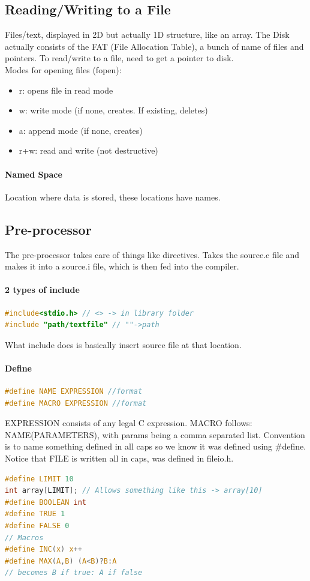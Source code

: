 \documentclass[12 pt]{article}
\begin{document}
\subsection{Reading/Writing to a File}
Files/text, displayed in 2D but actually 1D structure, like an array. The Disk actually consists of the FAT (File Allocation Table), a bunch of name of files and pointers. To read/write to a file, need to get a pointer to disk.
\\ Modes for opening files (fopen):
\begin{itemize}
\item r: opens file in read mode
\item w: write mode (if none, creates. If existing, deletes)
\item a: append mode (if none, creates)
\item r+w: read and write (not destructive)
\end{itemize}

\paragraph{Named Space}
Location where data is stored, these locations have names.
\subsection{Pre-processor}
The pre-processor takes care of things like directives. Takes the source.c file and makes it into a source.i file, which is then fed into the compiler.
\paragraph{2 types of include}
\begin{lstlisting}[language=c]
#include<stdio.h> // <> -> in library folder
#include "path/textfile" // ""->path
\end{lstlisting}
What include does is basically insert source file at that location.
\paragraph{Define}
\begin{lstlisting}[language=c]
#define NAME EXPRESSION //format
#define MACRO EXPRESSION //format
\end{lstlisting}
EXPRESSION consists of any legal C expression. MACRO follows: NAME(PARAMETERS), with params being a comma separated list. Convention is to name something defined in all caps so we know it was defined using \#define. Notice that FILE is written all in caps, was defined in fileio.h. 
\begin{lstlisting}[language=c]
#define LIMIT 10
int array[LIMIT]; // Allows something like this -> array[10]
#define BOOLEAN int
#define TRUE 1
#define FALSE 0
// Macros
#define INC(x) x++
#define MAX(A,B) (A<B)?B:A
// becomes B if true: A if false
\end{lstlisting}
\end{document}

